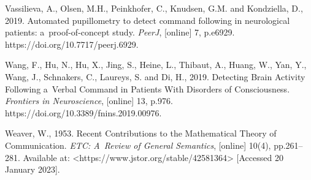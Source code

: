 Vassilieva, A., Olsen, M.H., Peinkhofer, C., Knudsen, G.M. and Kondziella, D., 2019. Automated pupillometry to detect command following in neurological patients: a~proof-of-concept study. \textit{PeerJ}, [online] 7, p.e6929. https://doi.org/10.7717/peerj.6929.

Wang, F., Hu, N., Hu, X., Jing, S., Heine, L., Thibaut, A., Huang, W., Yan, Y., Wang, J., Schnakers, C., Laureys, S. and Di, H., 2019. Detecting Brain Activity Following a~Verbal Command in Patients With Disorders of Consciousness. \textit{Frontiers in Neuroscience}, [online] 13, p.976. https://doi.org/10.3389/fnins.2019.00976.

Weaver, W., 1953. Recent Contributions to the Mathematical Theory of Communication. \textit{ETC: A~Review of General Semantics}, [online] 10(4), pp.261–281. Available at: {\textless}https://www.jstor.org/stable/42581364{\textgreater} [Accessed 20 January 2023].

